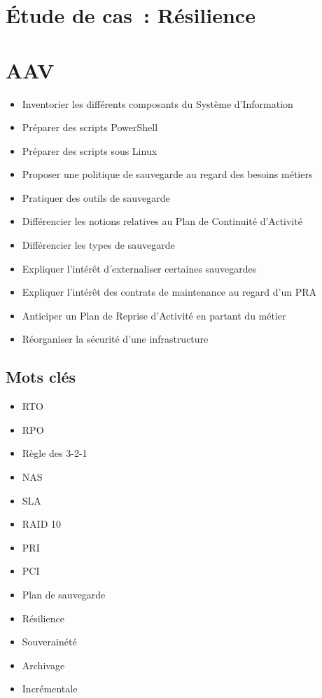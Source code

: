 \newpage
\section*{Étude de cas~: Résilience}

\section*{AAV}
\begin{itemize}
	\item [3] Inventorier les différents composants du Système d'Information
	\item [3] Préparer des scripts PowerShell
	\item [3] Préparer des scripts sous Linux
	\item [5] Proposer une politique de sauvegarde au regard des besoins métiers
	\item [3] Pratiquer des outils de sauvegarde
	\item [2] Différencier les notions relatives au Plan de Continuité d'Activité
	\item [2] Différencier les types de sauvegarde
	\item [2] Expliquer l'intérêt d'externaliser certaines sauvegardes
	\item [2] Expliquer l'intérêt des contrats de maintenance au regard d'un PRA
	\item [4] Anticiper un Plan de Reprise d'Activité en partant du métier
	\item [5] Réorganiser la sécurité d'une infrastructure
\end{itemize}

\subsection*{Mots clés}
{}
\begin{itemize}
	\item RTO
	\item RPO
	\item Règle des 3-2-1
	\item NAS
	\item SLA
	\item RAID 10
	\item PRI
	\item PCI
	\item Plan de sauvegarde
	\item Résilience
	\item Souverainété
	\item Archivage
	\item Incrémentale
\end{itemize}

